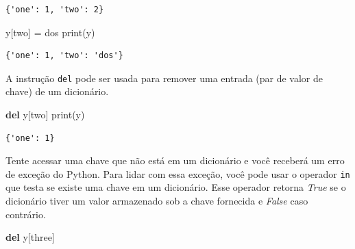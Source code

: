 \documentclass[
  brazilian,
  letterpaper,
  DIV=11,
  numbers=noendperiod]{scrreprt}
\newenvironment{Shaded}{\begin{snugshade}}{\end{snugshade}}
\newcommand{\BuiltInTok}[1]{\textcolor[rgb]{0.00,0.23,0.31}{#1}}
\newcommand{\KeywordTok}[1]{\textcolor[rgb]{0.00,0.23,0.31}{\textbf{#1}}}
\newcommand{\NormalTok}[1]{\textcolor[rgb]{0.00,0.23,0.31}{#1}}
\newcommand{\OperatorTok}[1]{\textcolor[rgb]{0.37,0.37,0.37}{#1}}
\newcommand{\StringTok}[1]{\textcolor[rgb]{0.13,0.47,0.30}{#1}}
\begin{document}
\begin{verbatim}
{'one': 1, 'two': 2}
\end{verbatim}

\begin{Shaded}
\begin{Highlighting}[]
\NormalTok{y[}\StringTok{\textquotesingle{}two\textquotesingle{}}\NormalTok{] }\OperatorTok{=} \StringTok{\textquotesingle{}dos\textquotesingle{}}
\BuiltInTok{print}\NormalTok{(y)}
\end{Highlighting}
\end{Shaded}

\begin{verbatim}
{'one': 1, 'two': 'dos'}
\end{verbatim}

A instrução \texttt{del} pode ser usada para remover uma entrada (par de
valor de chave) de um dicionário.

\begin{Shaded}
\begin{Highlighting}[]
\KeywordTok{del}\NormalTok{ y[}\StringTok{\textquotesingle{}two\textquotesingle{}}\NormalTok{]}
\BuiltInTok{print}\NormalTok{(y)}
\end{Highlighting}
\end{Shaded}

\begin{verbatim}
{'one': 1}
\end{verbatim}

Tente acessar uma chave que não está em um dicionário e você receberá um
erro de exceção do Python. Para lidar com essa exceção, você pode usar o
operador \texttt{in} que testa se existe uma chave em um dicionário.
Esse operador retorna \emph{True} se o dicionário tiver um valor
armazenado sob a chave fornecida e \emph{False} caso contrário.

\begin{Shaded}
\begin{Highlighting}[]
\KeywordTok{del}\NormalTok{ y[}\StringTok{\textquotesingle{}three\textquotesingle{}}\NormalTok{]}
\end{Highlighting}
\end{Shaded}
\end{document}
